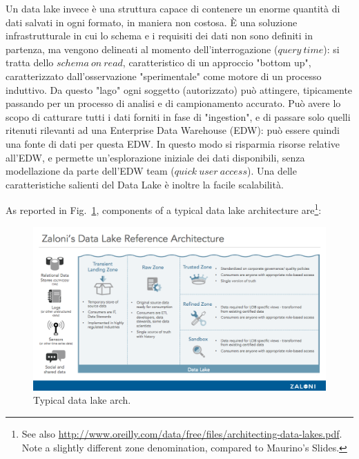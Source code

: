 \documentclass[a4page, 11pt]{article}
\begin{document}
Un data lake invece è una struttura capace di contenere un enorme quantità di dati salvati in ogni formato, in maniera non costosa.
\`E una soluzione infrastrutturale in cui lo schema e i requisiti dei dati non sono definiti in partenza, ma vengono delineati al momento dell'interrogazione ($query\ time$): si tratta dello $schema\ on\ read$, caratteristico di un approccio "bottom up", caratterizzato dall'osservazione "sperimentale" come motore di un processo induttivo. 
Da questo "lago" ogni soggetto (autorizzato) può attingere, tipicamente passando per un processo di analisi e di campionamento accurato. 
Può avere lo scopo di catturare tutti i dati forniti in fase di "ingestion", e di passare solo quelli ritenuti rilevanti ad una Enterprise Data Warehouse (EDW): può essere quindi una fonte di dati per questa EDW. In questo modo si risparmia risorse relative all'EDW, e permette un'esplorazione iniziale dei dati disponibili, senza modellazione da parte dell'EDW team ($quick\ user \ access$).
Una delle caratteristiche salienti del Data Lake è inoltre la facile scalabilità. 

As reported in Fig.~\ref{data_lake_arch:fig}, components of a typical data lake architecture are\footnote{See also \url{http://www.oreilly.com/data/free/files/architecting-data-lakes.pdf}. Note a slightly different zone denomination, compared to Maurino's Slides.}:

\begin{figure}
\centering
\includegraphics[width=120mm]{data_lake_arch.png}
\caption{\label{data_lake_arch:fig} Typical data lake arch.
}
\end{figure}
\end{document}
